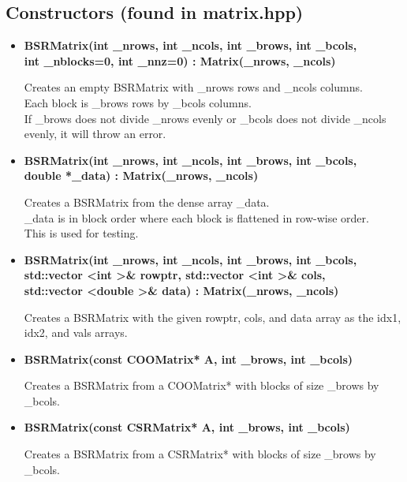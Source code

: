 \documentclass{article}
\newcommand\tab[1][1cm]{\hspace*{#1}}
\begin{document}
\subsection*{Constructors (found in matrix.hpp)}
    \begin{itemize}
        \item \textbf{BSRMatrix(int \_nrows, int \_ncols, int \_brows, int \_bcols, \\
                \tab int \_nblocks=0, int \_nnz=0) : Matrix(\_nrows, \_ncols)}
                
                    Creates an empty BSRMatrix with \_nrows rows and \_ncols columns. \\   
                    Each block is \_brows rows by \_bcols columns. \\
                    If \_brows does not divide \_nrows evenly or \_bcols does not
                    divide \_ncols evenly, it will throw an error.
                        
        \item \textbf{BSRMatrix(int \_nrows, int \_ncols, int \_brows, int \_bcols, \\ 
                \tab double *\_data) : Matrix(\_nrows, \_ncols)}
                
                    Creates a BSRMatrix from the dense array \_data. \\
                    \_data is in block order where each block is flattened in row-wise
                    order. \\
                    This is used for testing.
                        
        \item \textbf{BSRMatrix(int \_nrows, int \_ncols, int \_brows, int \_bcols, \\
                \tab std::vector \textless int \textgreater\& rowptr, 
                     std::vector \textless int \textgreater\& cols, \\
                \tab std::vector \textless double \textgreater\& data) : 
                     Matrix(\_nrows, \_ncols)}
                     
                    Creates a BSRMatrix with the given rowptr, cols, and data array as the
                    idx1, idx2, and vals arrays.
        
        \item \textbf{BSRMatrix(const COOMatrix* A, int \_brows, int \_bcols)}
        
                    Creates a BSRMatrix from a COOMatrix* with blocks of size
                    \_brows by \_bcols.
        
        \item \textbf{BSRMatrix(const CSRMatrix* A, int \_brows, int \_bcols)}
        
                    Creates a BSRMatrix from a CSRMatrix* with blocks of size
                    \_brows by \_bcols.
    \end{itemize}
    
\end{document}
